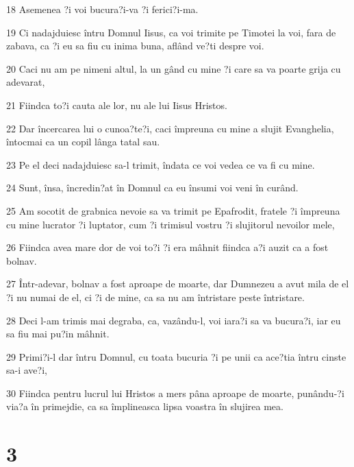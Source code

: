 \par 18 Asemenea ?i voi bucura?i-va ?i ferici?i-ma.
\par 19 Ci nadajduiesc întru Domnul Iisus, ca voi trimite pe Timotei la voi, fara de zabava, ca ?i eu sa fiu cu inima buna, aflând ve?ti despre voi.
\par 20 Caci nu am pe nimeni altul, la un gând cu mine ?i care sa va poarte grija cu adevarat,
\par 21 Fiindca to?i cauta ale lor, nu ale lui Iisus Hristos.
\par 22 Dar încercarea lui o cunoa?te?i, caci împreuna cu mine a slujit Evanghelia, întocmai ca un copil lânga tatal sau.
\par 23 Pe el deci nadajduiesc sa-l trimit, îndata ce voi vedea ce va fi cu mine.
\par 24 Sunt, însa, încredin?at în Domnul ca eu însumi voi veni în curând.
\par 25 Am socotit de grabnica nevoie sa va trimit pe Epafrodit, fratele ?i împreuna cu mine lucrator ?i luptator, cum ?i trimisul vostru ?i slujitorul nevoilor mele,
\par 26 Fiindca avea mare dor de voi to?i ?i era mâhnit fiindca a?i auzit ca a fost bolnav.
\par 27 Într-adevar, bolnav a fost aproape de moarte, dar Dumnezeu a avut mila de el ?i nu numai de el, ci ?i de mine, ca sa nu am întristare peste întristare.
\par 28 Deci l-am trimis mai degraba, ca, vazându-l, voi iara?i sa va bucura?i, iar eu sa fiu mai pu?in mâhnit.
\par 29 Primi?i-l dar întru Domnul, cu toata bucuria ?i pe unii ca ace?tia întru cinste sa-i ave?i,
\par 30 Fiindca pentru lucrul lui Hristos a mers pâna aproape de moarte, punându-?i via?a în primejdie, ca sa împlineasca lipsa voastra în slujirea mea.

\chapter{3}

